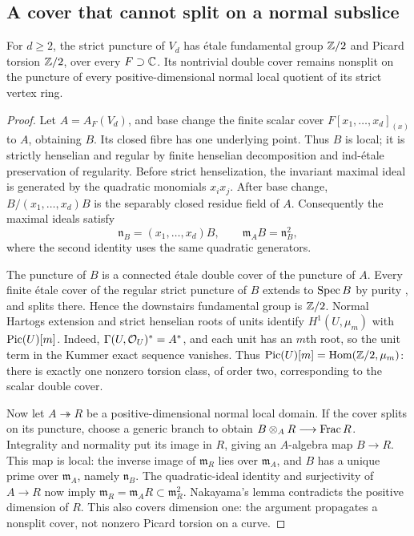 \subsection{A cover that cannot split on a normal subslice}
\begin{lemma}\label{tor:veronese-cover}
For $d\ge2$, the strict puncture of $V_d$ has \'etale fundamental group $\mathbb Z/2$ and Picard torsion $\mathbb Z/2$, over every $F\supset\mathbb C$. Its nontrivial double cover remains nonsplit on the puncture of every positive-dimensional normal local quotient of its strict vertex ring.
\end{lemma}
\begin{proof}
Let $A=A_F(V_d)$, and base change the finite scalar cover $F[x_1,\ldots,x_d]_{(x)}$ to $A$, obtaining $B$. Its closed fibre has one underlying point. Thus $B$ is local; it is strictly henselian and regular by finite henselian decomposition and ind-\'etale preservation of regularity. Before strict henselization, the invariant maximal ideal is generated by the quadratic monomials $x_ix_j$. After base change, $B/(x_1,\ldots,x_d)B$ is the separably closed residue field of $A$. Consequently the maximal ideals satisfy
\[
 \mathfrak n_B=(x_1,\ldots,x_d)B,
 \qquad \mathfrak m_AB=\mathfrak n_B^2,
\]
where the second identity uses the same quadratic generators.

The puncture of $B$ is a connected \'etale double cover of the puncture of $A$. Every finite \'etale cover of the regular strict puncture of $B$ extends to $\operatorname{Spec} B$ by purity \cite[Tag~0BMA, assertion~(1)]{The26}, and splits there. Hence the downstairs fundamental group is $\mathbb Z/2$. Normal Hartogs extension and strict henselian roots of units identify $H^1(U,\mu_m)$ with $\operatorname{Pic}(U)[m]$. Indeed, $\Gamma(U,\mathcal O_U)^*=A^*$, and each unit has an $m$th root, so the unit term in the Kummer exact sequence vanishes. Thus $\operatorname{Pic}(U)[m]=\operatorname{Hom}(\mathbb Z/2,\mu_m)$: there is exactly one nonzero torsion class, of order two, corresponding to the scalar double cover.

Now let $A\twoheadrightarrow R$ be a positive-dimensional normal local domain. If the cover splits on its puncture, choose a generic branch to obtain $B\otimes_A R\longrightarrow\operatorname{Frac} R$. Integrality and normality put its image in $R$, giving an $A$-algebra map $B\longrightarrow R$. This map is local: the inverse image of $\mathfrak m_R$ lies over $\mathfrak m_A$, and $B$ has a unique prime over $\mathfrak m_A$, namely $\mathfrak n_B$. The quadratic-ideal identity and surjectivity of $A\longrightarrow R$ now imply $\mathfrak m_R=\mathfrak m_AR\subset\mathfrak m_R^2$. Nakayama's lemma contradicts the positive dimension of $R$. This also covers dimension one: the argument propagates a nonsplit cover, not nonzero Picard torsion on a curve.
\end{proof}

